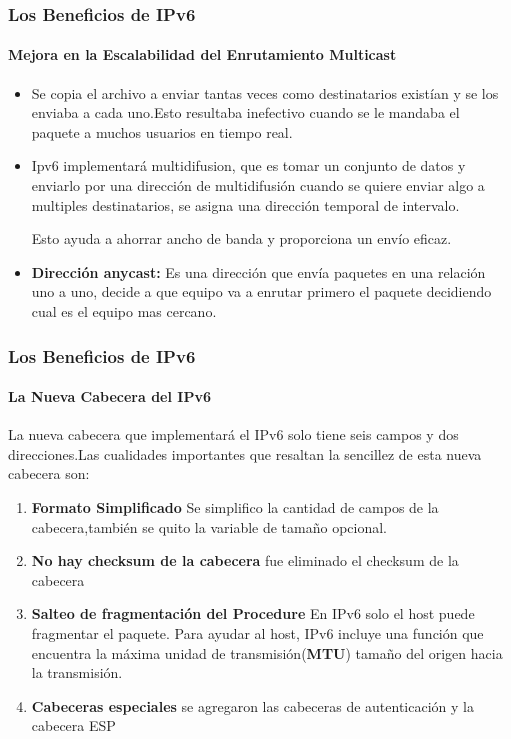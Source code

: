 \documentclass{beamer}
\begin{document}
\begin{frame}
\frametitle{Los Beneficios de IPv6}
\framesubtitle{Mejora en la Escalabilidad del Enrutamiento Multicast}
\begin{itemize}
\item Se copia  el archivo a enviar tantas 
veces como destinatarios existían y se los enviaba a cada uno.Esto resultaba inefectivo cuando se le mandaba el paquete a muchos usuarios en tiempo real.\par
\item Ipv6 implementará multidifusion, que es tomar  un conjunto de datos y enviarlo por una dirección de multidifusión
cuando se quiere enviar algo a multiples destinatarios, se asigna una dirección temporal de intervalo.\par
Esto ayuda a ahorrar ancho de banda y proporciona un envío eficaz.
\item  \textbf{Dirección anycast:} Es una dirección que envía paquetes en una relación uno a uno, decide a que equipo va a enrutar primero el paquete decidiendo cual es el equipo mas cercano.
 \end{itemize}
\end{frame}


\begin{frame}
\frametitle{Los Beneficios de IPv6}
\framesubtitle{La Nueva Cabecera del IPv6}
La nueva cabecera que implementará el IPv6 solo tiene seis campos y dos direcciones.Las cualidades importantes que resaltan la sencillez de esta nueva cabecera son:
 \begin{enumerate}
\item \textbf{Formato Simplificado} Se simplifico la cantidad de campos de la cabecera,también se quito la 
variable de tamaño opcional.
\item \textbf{No hay checksum de la cabecera} fue eliminado el checksum de la cabecera
\item \textbf{Salteo de fragmentación del Procedure} En IPv6 solo el host puede fragmentar el paquete. Para ayudar al 
host, IPv6 incluye una función que encuentra la máxima unidad de transmisión(\textbf{MTU}) tamaño 
del origen hacia la transmisión.
\item \textbf{Cabeceras especiales} se agregaron las cabeceras de autenticación y la cabecera ESP

\end {enumerate}
\end{frame}

\end{document}
